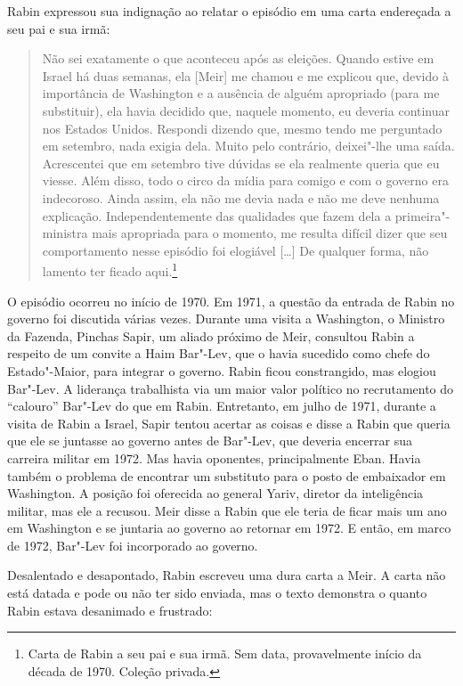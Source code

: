 Rabin expressou sua indignação ao relatar o episódio em uma carta
endereçada a seu pai e sua irmã:

\begin{quote}
Não sei exatamente o que aconteceu após as eleições. Quando estive em
Israel há duas semanas, ela {[}Meir{]} me chamou e me explicou que, devido à
importância de Washington e a ausência de alguém apropriado (para
me substituir), ela havia decidido que, naquele momento, eu deveria
continuar nos Estados Unidos. Respondi dizendo que, mesmo tendo me
perguntado em setembro, nada exigia dela. Muito pelo contrário,
deixei"-lhe uma saída. Acrescentei que em setembro tive dúvidas se ela
realmente queria que eu viesse. Além disso, todo o circo da mídia para comigo e
com o governo era indecoroso. Ainda assim, ela não me devia nada e não
me deve nenhuma explicação. Independentemente das qualidades que fazem
dela a primeira"-ministra mais apropriada para o momento, me resulta
difícil dizer que seu comportamento nesse episódio foi elogiável {[}\ldots{}{]} De
qualquer forma, não lamento ter ficado aqui.\footnote{Carta de Rabin a seu pai e sua irmã. Sem data, provavelmente início da década de 1970. Coleção privada.}
\end{quote}

O episódio ocorreu no início de 1970. Em 1971, a questão da entrada de
Rabin no governo foi discutida várias vezes. Durante uma visita a
Washington, o Ministro da Fazenda, Pinchas Sapir, um aliado próximo de
Meir, consultou Rabin a respeito de um convite a Haim Bar"-Lev, que o
havia sucedido como chefe do Estado"-Maior, para integrar o governo.
Rabin ficou constrangido, mas elogiou Bar"-Lev. A liderança trabalhista
via um maior valor político no recrutamento do ``calouro'' Bar"-Lev do que
em Rabin. Entretanto, em julho de 1971, durante a visita de Rabin a
Israel, Sapir tentou acertar as coisas e disse a Rabin que queria que
ele se juntasse ao governo antes de Bar"-Lev, que deveria encerrar sua
carreira militar em 1972. Mas havia oponentes, principalmente Eban.
Havia também o problema de encontrar um substituto para o posto de
embaixador em Washington. A posição foi oferecida ao general Yariv,
diretor da inteligência militar, mas ele a recusou. Meir disse a Rabin
que ele teria de ficar mais um ano em Washington e se juntaria ao
governo ao retornar em 1972. E então, em marco de 1972, Bar"-Lev foi
incorporado ao governo.

Desalentado e desapontado, Rabin escreveu uma dura carta a Meir. A carta
não está datada e pode ou não ter sido enviada, mas o texto demonstra o
quanto Rabin estava desanimado e frustrado:

